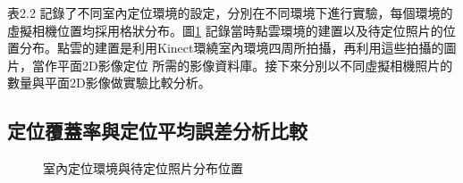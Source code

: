 	表2.2 記錄了不同室內定位環境的設定，分別在不同環境下進行實驗，每個環境的虛擬相機位置均採用格狀分布。圖\ref{fig:Indoor_EV_and_Query}
記錄當時點雲環境的建置以及待定位照片的位置分布。點雲的建置是利用Kinect環繞室內環境四周所拍攝，再利用這些拍攝的圖片，當作平面2D影像定位
所需的影像資料庫。接下來分別以不同虛擬相機照片的數量與平面2D影像做實驗比較分析。
	
\subsection{定位覆蓋率與定位平均誤差分析比較}

\begin{figure}
	\begin{center}
	\end{center}
  \caption{室內定位環境與待定位照片分布位置}
  \label{fig:Indoor_EV_and_Query}	
\end{figure}		

